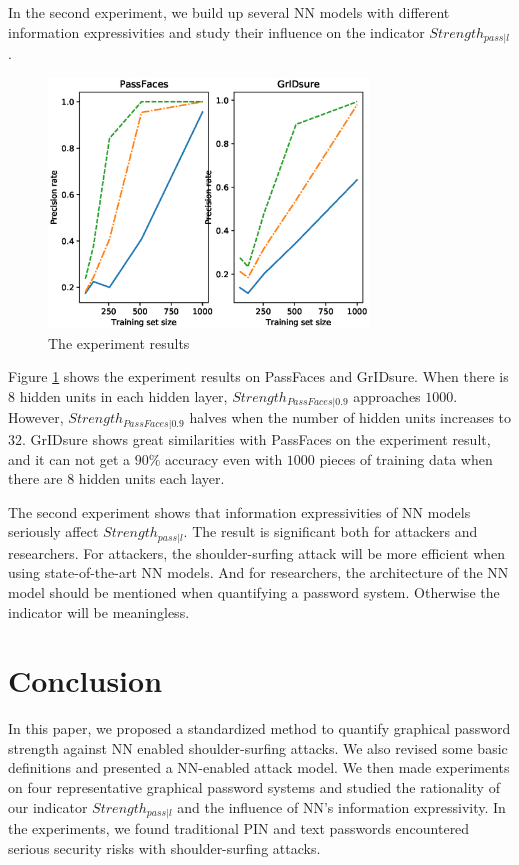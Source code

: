 \documentclass{article}
\begin{document}
  In the second experiment, we build up several NN models with different information expressivities and study 
  their influence on the indicator $Strength_{pass|l}$.
  \begin{figure}[htb]
    \centering
    \includegraphics[width=8.5cm]{line2.eps}
    \caption{The experiment results}
    \label{fig:results2}
  \end{figure}
  
  Figure \ref{fig:results2} shows the experiment results on PassFaces and GrIDsure. When there is $8$ hidden 
  units in each hidden layer, $Strength_{PassFaces|0.9}$ approaches $1000$. However, $Strength_{PassFaces|0.9}$ halves 
  when the number of hidden units increases to $32$. GrIDsure shows great similarities with PassFaces on the 
  experiment result, and it can not get a $90\%$ accuracy even with $1000$ pieces of training data when there 
  are $8$ hidden units each layer.
  
  The second experiment shows that information expressivities of NN models seriously affect $Strength_{pass|l}$. 
  The result is significant both for attackers and researchers. For attackers, the shoulder-surfing attack will be 
  more efficient when using state-of-the-art NN models. And for researchers, the architecture of the NN model should 
  be mentioned when quantifying a password system. Otherwise the indicator will be meaningless.
  
  \section{Conclusion}
  \label{sec:conclusion}
  In this paper, we proposed a standardized method to quantify graphical password strength against NN enabled 
  shoulder-surfing attacks. We also revised some basic definitions and presented a NN-enabled attack model. 
  We then made experiments on four representative graphical password systems and studied the rationality of 
  our indicator $Strength_{pass|l}$ and the influence of NN's information expressivity. In the experiments, 
  we found traditional PIN and text passwords encountered serious security risks with shoulder-surfing attacks. 
  
\end{document}
